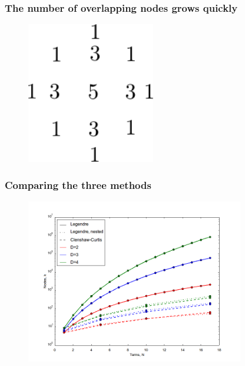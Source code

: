 \documentclass{beamer}
\begin{document}
\begin{frame}
 \frametitle{The number of overlapping nodes grows quickly}
 \begin{figure}
  \includegraphics[width=0.5\textwidth]{smolyak_nested_nr.png}
 \end{figure}

\end{frame}

%  
%  
 
 \begin{frame}
  \frametitle{Comparing the three methods}

 \begin{figure}
  \includegraphics[width=0.85\textwidth]{dimensionality_nodes_nested.png}
 \end{figure}
 \end{frame}
\end{document}
